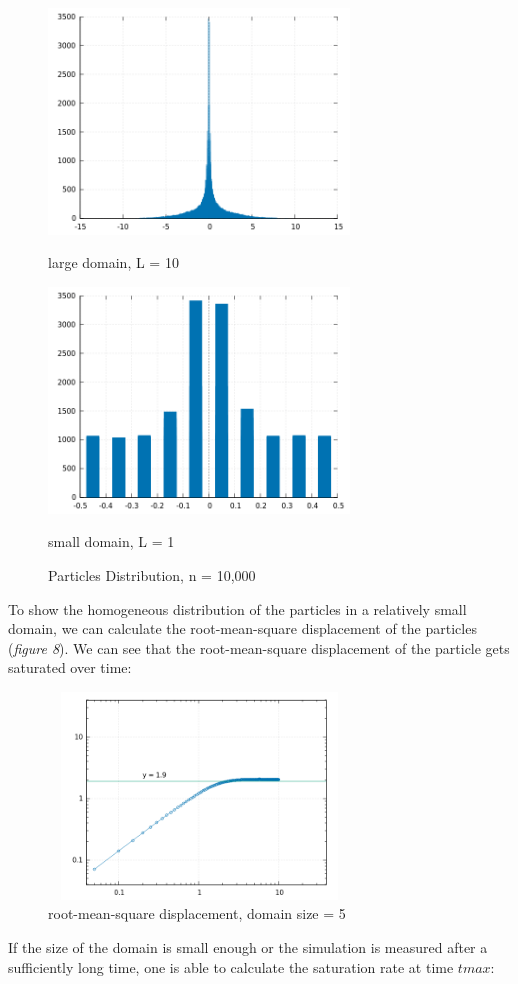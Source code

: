 \documentclass[a4paper,11pt]{article}
\begin{document}
\begin{itemize}
\begin{figure}[!htb]
    \centering
    \begin{minipage}{.5\textwidth}
      \centering
      \includegraphics[width=8cm, height=6cm]{pd1.png}
      \caption{\small large domain, L = 10}
    \end{minipage}%
    \begin{minipage}{.5\textwidth}
      \centering
      \includegraphics[width=8cm, height=6cm]{pd2.png}
      \caption{\small small domain, L = 1}
    \end{minipage}
    \caption*{Particles Distribution, n = 10,000}
\end{figure}
\newpage
To show the homogeneous distribution of the particles in a relatively small domain, we can calculate the root-mean-square displacement of the particles (\emph{figure 8}). We can see that the root-mean-square displacement of the particle gets saturated over time:

\begin{figure}[!htb]
  \centering
  \includegraphics[width=8cm, height=5.5cm]{m1.png}
  \caption{\small root-mean-square displacement, domain size = 5}
\end{figure}
If the size of the domain is small enough or the simulation is measured after a sufficiently long time, one is able to calculate the saturation rate at time \(tmax\):


\end{itemize}
\end{document}
